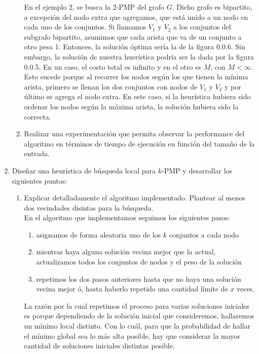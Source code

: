 \documentclass[11pt, a4paper, twoside]{article}
\begin{document}
\begin{enumerate}
\begin{enumerate}
		En el ejemplo 2, se busca la 2-PMP del grafo $G$. Dicho grafo es bipartito, a excepción del nodo extra que 
		agregamos, que está unido a un nodo en cada uno de los conjuntos. Si llamamos $V_{1}$ y $V_{2}$ a los
		conjuntos del subgrafo bipartito, asumimos que cada arista que va de un conjunto a otro pesa 1. Entonces, 
		la solución óptima sería la de la figura 0.0.6. Sin embargo, la solución de nuestra huerística podría ser la 
		dada por la figura 0.0.5. En un caso, el costo total es infinito y en el otro es $M$, con $M < \infty$. 
		Esto sucede porque al recorrer los nodos según los que tienen la mínima arista, primero se llenan los dos 
		conjuntos con nodos de $V_{1}$ y $V_{2}$ y por último se agrega el nodo extra. En este caso, si la heurística
		hubiera sido ordenar los nodos según la máxima arista, la solución hubiera sido la correcta. \\
		
		
		\item Realizar una experimentación que permita observar la performance del algoritmo en términos
		de tiempo de ejecución en función del tamaño de la entrada.
    \end{enumerate}
    
    \item Diseñar una heurística de búsqueda local para $k$-PMP y desarrollar los siguientes puntos:
    \begin{enumerate}
		\item Explicar detalladamente el algoritmo implementado. Plantear al menos dos vecindades disintas
		para la búsqueda. \\
		En el algoritmo que implementamos seguimos los siguientes pasos:
		\begin{enumerate}
			\item asignamos de forma aleatoria uno de los $k$ conjuntos a cada nodo
			\item mientras haya alguna solución vecina mejor que la actual, actualizamos todos los
			      conjuntos de nodos y el peso de la solución
			\item repetimos los dos pasos anteriores hasta que no haya una solución vecina mejor ó, hasta
			      haberlo repetido una cantidad límite de $x$ veces.
		\end{enumerate}
		La razón por la cual repetimos el proceso para varias soluciones iniciales es porque dependiendo
		de la solución inicial que consideremos, hallaremos un mínimo local distinto. Con lo cuál, para
		que la probabilidad de hallar el mínimo global sea lo más alta posible, hay que considerar 
		la mayor cantidad de soluciones iniciales distintas posible.
		

\end{enumerate}
\end{enumerate}
\end{document}
